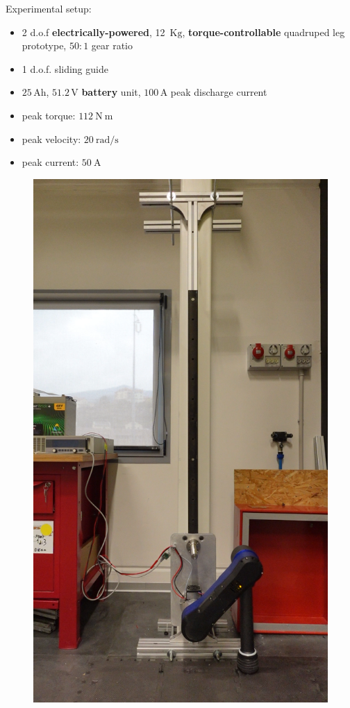 \documentclass[aspectratio=169]{beamer}
\begin{document}
\begin{frame}
	\begin{multicols}{2}
		\vfill\null
		Experimental setup: 
		\begin{itemize}
			\item 2 d.o.f \textbf{electrically-powered}, 12~$\mathrm{Kg}$,  \textbf{torque-controllable} quadruped leg prototype, $50:1$ gear ratio
			\item 1 d.o.f. sliding guide
			\item $25\,\mathrm{Ah}$, $51.2\,\mathrm{V}$ \textbf{battery} unit, $100\,\mathrm{A}$ peak discharge current
			\item peak torque: $112~\mathrm{N~m}$
			\item peak velocity: $20~\mathrm{rad/s}$
			\item peak current: $50~\mathrm{A}$
		\end{itemize}
		\vfill\null
		\columnbreak
		\vfill\null
		\vspace{0.5cm}
		\begin{figure}
			\centering
			\includegraphics[width=0.5\columnwidth]{beamer_imgs/jump_sequence_intro_image/real1.png}
		\end{figure}
	\end{multicols}
\end{frame}

\end{document}
